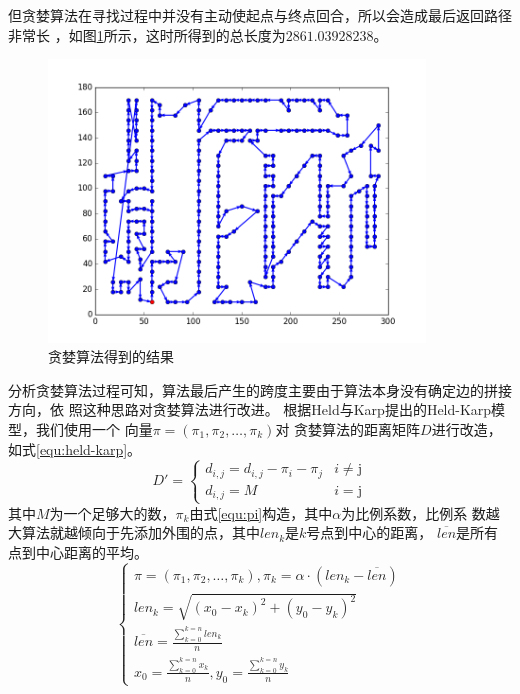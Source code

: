 \documentclass[fontset=windows,a4paper,12pt]{ctexart}
\begin{document}
         但贪婪算法在寻找过程中并没有主动使起点与终点回合，所以会造成最后返回路径非常长
         ，如图\ref{fig:fail}所示，这时所得到的总长度为$2861.03928238$。
         \begin{figure}[htbp]
            \centering
            \includegraphics[width=10cm]{pic/greedy_fail.png}
            \caption{贪婪算法得到的结果}
            \label{fig:fail}
        \end{figure}
        分析贪婪算法过程可知，算法最后产生的跨度主要由于算法本身没有确定边的拼接方向，依
        照这种思路对贪婪算法进行改进。
        根据Held与Karp提出的Held-Karp模型\cite{held1970traveling}，我们使用一个
        向量$\pi=(\pi_1,\pi_2,\dots,\pi_k)$对
        贪婪算法的距离矩阵$D$进行改造，如式\ref{equ:held-karp}。
        \begin{equation}
	        D'=\left\{
		        \begin{array}{ll}
		        	d_{i,j} = d_{i,j} - \pi_i - \pi_j & \textrm{$i \neq $j}\\
		        	d_{i,j} = M & \textrm{$i=$j}
		        \end{array}
	        \right.
	        \label{equ:held-karp}
        \end{equation}
        其中$M$为一个足够大的数，$\pi_k$由式\ref{equ:pi}构造，其中$\alpha$为比例系数，比例系
        数越大算法就越倾向于先添加外围的点，其中$len_k$是$k$号点到中心的距离，
        $\overline{len}$是所有点到中心距离的平均。
        \begin{equation}
             \left\{
	             \begin{array}{l}
		             \pi=(\pi_1,\pi_2,\dots{,\pi_k}),\pi_k=\alpha\cdot(len_k-\overline{len})\\
		             len_k = \sqrt{(x_0-x_k)^2+(y_0-y_k)^2}\\
		             \overline{len} = \frac{\sum_{k=0}^{k=n}len_k}{n}\\
		             x_0 = \frac{\sum_{k=0}^{k=n}x_k}{n},y_0 = \frac{\sum_{k=0}^{k=n}y_k}{n}
	             \end{array}
             \right.
             \label{equ:pi}
        \end{equation}
\end{document}
